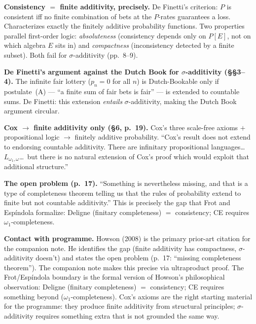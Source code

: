 \medskip\noindent
\textbf{Consistency $=$ finite additivity, precisely.}  De Finetti's
criterion: $P$ is consistent iff no finite combination of bets at
the $P$-rates guarantees a loss.  Characterizes exactly the
finitely additive probability functions.  Two properties parallel
first-order logic: \emph{absoluteness} (consistency depends only
on $P[E]$, not on which algebra $E$ sits in) and
\emph{compactness} (inconsistency detected by a finite subset).
Both fail for $\sigma$-additivity (pp.~8--9).

\medskip\noindent
\textbf{De Finetti's argument against the Dutch Book for
$\sigma$-additivity (\S\S 3--4).}  The infinite fair lottery
($p_n = 0$ for all $n$) is Dutch-Bookable only if postulate~(A)
--- ``a finite sum of fair bets is fair'' --- is extended to
countable sums.  De Finetti: this extension \emph{entails}
$\sigma$-additivity, making the Dutch Book argument circular.

\medskip\noindent
\textbf{Cox $\to$ finite additivity only (\S 6, p.~19).}  Cox's
three scale-free axioms $+$ propositional logic $\to$ finitely
additive probability.  ``Cox's result does not extend to endorsing
countable additivity.  There are infinitary propositional
languages\ldots\ $L_{\omega_1,\omega}$\ldots\ but there is no
natural extension of Cox's proof which would exploit that
additional structure.''

\medskip\noindent
\textbf{The open problem (p.~17).}  ``Something is nevertheless
missing, and that is a type of completeness theorem telling us that
the rules of probability extend to finite but not countable
additivity.''  This is precisely the gap that Frot and
Esp\'{i}ndola formalize: Deligne (finitary completeness) $=$
consistency; CE requires $\omega_1$-completeness.

\medskip\noindent
\textbf{Contact with programme.}  Howson (2008) is the primary
prior-art citation for the companion note.  He identifies the gap
(finite additivity has compactness, $\sigma$-additivity doesn't)
and states the open problem (p.~17: ``missing completeness
theorem'').  The companion note makes this precise via ultraproduct
proof.  The Frot/Esp\'{i}ndola boundary is the formal version of
Howson's philosophical observation: Deligne (finitary completeness)
$=$ consistency; CE requires something beyond
($\omega_1$-completeness).  Cox's axioms are the right starting
material for the programme: they produce finite additivity from
structural principles; $\sigma$-additivity requires something extra
that is not grounded the same way.


